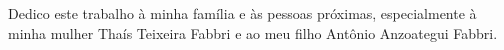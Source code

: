 Dedico este trabalho à minha família e às pessoas próximas, especialmente
à minha mulher Thaís Teixeira Fabbri e ao meu filho Antônio Anzoategui Fabbri.